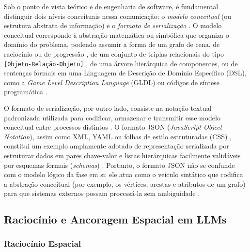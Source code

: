 Sob o ponto de vista teórico e de engenharia de software, é fundamental distinguir dois níveis conceituais nessa comunicação: o \textit{modelo conceitual} (ou estrutura abstrata de informação) e o \textit{formato de serialização} \cite{xu2025constraint, xu2025databasedrivenframework3dlevel, chen2025narrative}. O modelo conceitual corresponde à abstração matemática ou simbólica que organiza o domínio do problema, podendo assumir a forma de um grafo de cena, de raciocínio ou de progressão \cite{xu2025databasedrivenframework3dlevel, wang2026designerlyloop}, de um conjunto de triplas relacionais do tipo \texttt{[Objeto-Relação-Objeto]} \cite{chen2025narrative}, de uma árvore hierárquica de componentes, ou de sentenças formais em uma Linguagem de Descrição de Domínio Específico (DSL), como a \textit{Game Level Description Language} (GLDL) \cite{xu2025constraint} ou códigos de síntese programática \cite{hu2024scenecraft, yang2026codeasroomgenerating3drooms}.

O formato de serialização, por outro lado, consiste na notação textual padronizada utilizada para codificar, armazenar e transmitir esse modelo conceitual entre processos distintos \cite{sun2024roomplanner, xu2025databasedrivenframework3dlevel}. O formato JSON (\textit{JavaScript Object Notation}), assim como XML, YAML ou folhas de estilo estruturadas (CSS) \cite{ocal2024sceneteller}, constitui um exemplo amplamente adotado de representação serializada por estruturar dados em pares chave-valor e listas hierárquicas facilmente validáveis por esquemas formais (\textit{schemas}) \cite{tang2025unrealllm, sun2024roomplanner, xu2025databasedrivenframework3dlevel}. Portanto, o formato JSON não se confunde com o modelo lógico da fase em si: ele atua como o veículo sintático que codifica a abstração conceitual (por exemplo, os vértices, arestas e atributos de um grafo) para que sistemas externos possam processá-la sem ambiguidade \cite{tang2025unrealllm, xu2025databasedrivenframework3dlevel}.

\subsection{Raciocínio e Ancoragem Espacial em LLMs}
\label{sec:spatial_grounding}

\subsubsection{Raciocínio Espacial}
\label{sec:raciocinio_espacial}

